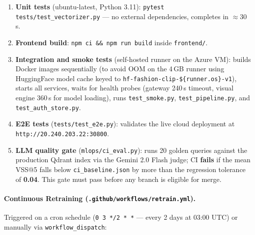 \documentclass[12pt]{article}
\begin{document}
\begin{enumerate}[leftmargin=*]
  \item \textbf{Unit tests} (ubuntu-latest, Python 3.11): \texttt{pytest tests/test\_vectorizer.py} --- no external dependencies, completes in $\approx$30\,s.
  \item \textbf{Frontend build}: \texttt{npm ci \&\& npm run build} inside \texttt{frontend/}.
  \item \textbf{Integration and smoke tests} (self-hosted runner on the Azure VM): builds Docker images sequentially (to avoid OOM on the 4\,GB runner using HuggingFace model cache keyed to \texttt{hf-fashion-clip-\$\{runner.os\}-v1}), starts all services, waits for health probes (gateway 240\,s timeout, visual engine 360\,s for model loading), runs \texttt{test\_smoke.py}, \texttt{test\_pipeline.py}, and \texttt{test\_auth\_store.py}.
  \item \textbf{E2E tests} (\texttt{tests/test\_e2e.py}): validates the live cloud deployment at \texttt{http://20.240.203.22:30800}.
  \item \textbf{LLM quality gate} (\texttt{mlops/ci\_eval.py}): runs 20 golden queries against the production Qdrant index via the Gemini 2.0 Flash judge; CI \textbf{fails} if the mean VSS@5 falls below \texttt{ci\_baseline.json} by more than the regression tolerance of \textbf{0.04}. This gate must pass before any branch is eligible for merge.
\end{enumerate}

\paragraph{Continuous Retraining (\texttt{.github/workflows/retrain.yml}).}
Triggered on a cron schedule (\texttt{0 3 */2 * *} --- every 2 days at 03:00 UTC) or manually via \texttt{workflow\_dispatch}:
\end{document}
